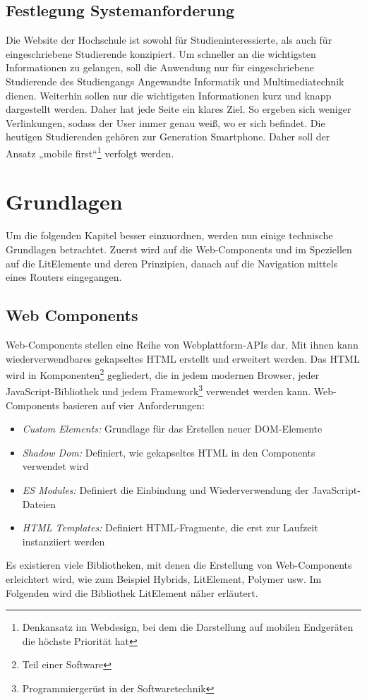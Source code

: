 \documentclass[12pt,					%
							 oneside,			%
							 a4paper,			%
							 halfparskip,		%
							 liststotoc,			%
							 bibtotoc,			%
							 fleqn,				%
							 pointlessnumbers]	%
							 {scrreprt}
\begin{document}
		\section{Festlegung Systemanforderung}
		Die Website der Hochschule ist sowohl für Studieninteressierte, als auch für eingeschriebene Studierende konzipiert. Um schneller an die wichtigsten Informationen zu gelangen, soll die Anwendung nur für eingeschriebene Studierende des Studiengangs Angewandte Informatik und Multimediatechnik dienen. Weiterhin sollen nur die wichtigsten Informationen kurz und knapp dargestellt werden. Daher hat jede Seite ein klares Ziel.	So ergeben sich weniger Verlinkungen, sodass der User immer genau weiß, wo er sich befindet. Die heutigen Studierenden gehören zur Generation Smartphone. Daher soll der Ansatz „mobile first“\footnote{\label{foot:1}Denkansatz im Webdesign, bei dem die Darstellung auf mobilen Endgeräten die höchste Priorität hat} verfolgt werden.
	
\chapter{Grundlagen}		
Um die folgenden Kapitel besser einzuordnen, werden nun einige technische Grundlagen betrachtet. Zuerst wird auf die Web-Components und im Speziellen auf die LitElemente und deren Prinzipien, danach auf die Navigation mittels eines Routers eingegangen.
	
		\section{Web Components}
		Web-Components stellen eine Reihe von Webplattform-APIs dar. Mit ihnen kann wiederverwendbares gekapseltes HTML erstellt und erweitert werden. Das HTML wird in Komponenten\footnote{\label{foot:1}Teil einer Software} gegliedert, die in jedem modernen Browser, jeder JavaScript-Bibliothek und jedem Framework\footnote{\label{foot:1}Programmiergerüst in der Softwaretechnik} verwendet werden kann. Web-Components basieren auf vier Anforderungen: 
\begin{itemize}
\item \textit{Custom Elements:} Grundlage für das Erstellen neuer DOM-Elemente
\item \textit{Shadow Dom:} Definiert, wie gekapseltes HTML in den Components verwendet wird
\item \textit{ES Modules:} Definiert die Einbindung und Wiederverwendung der JavaScript-Dateien
\item \textit{HTML Templates:} Definiert HTML-Fragmente, die erst zur Laufzeit instanziiert werden
\end{itemize} Es existieren viele Bibliotheken, mit denen die Erstellung von Web-Components erleichtert wird, wie zum Beispiel Hybrids, LitElement, Polymer usw. Im Folgenden wird die Bibliothek LitElement näher erläutert.\cite{webcom}
\end{document}
